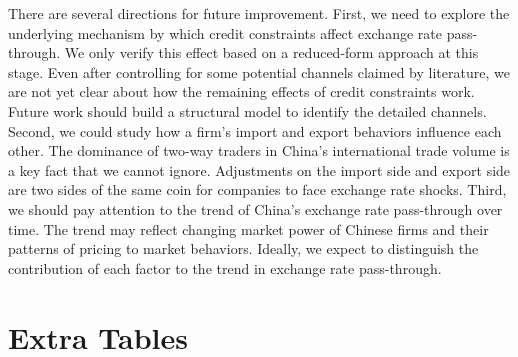 \documentclass[12pt]{article}
\begin{document}
There are several directions for future improvement. First, we need to explore the underlying mechanism by which credit constraints affect exchange rate pass-through. We only verify this effect based on a reduced-form approach at this stage. Even after controlling for some potential channels claimed by literature, we are not yet clear about how the remaining effects of credit constraints work. Future work should build a structural model to identify the detailed channels. Second, we could study how a firm's import and export behaviors influence each other. The dominance of two-way traders in China's international trade volume is a key fact that we cannot ignore. Adjustments on the import side and export side are two sides of the same coin for companies to face exchange rate shocks. Third, we should pay attention to the trend of China's exchange rate pass-through over time. The trend may reflect changing market power of Chinese firms and their patterns of pricing to market behaviors. Ideally, we expect to distinguish the contribution of each factor to the trend in exchange rate pass-through. 

\newpage 


\appendix

\section{Extra Tables}\label{Appendix-Tables}

\setcounter{table}{0}

\renewcommand{\thetable}{A\arabic{table}}
\end{document}
